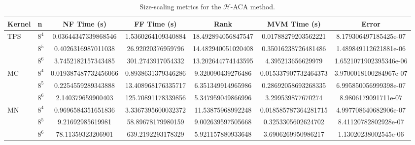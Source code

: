 \documentclass[final,3p,times]{elsarticle}
\newcommand{\mc}[1]{\mathcal{#1}}
\begin{document}
\begin{table}[!ht]
\centering
\scriptsize
\begin{tabular}{llSSSSS}
\hline
\textbf{Kernel} & \textbf{n} & \textbf{NF Time (s)} & \textbf{FF Time (s)} & \textbf{Rank} & \textbf{MVM Time (s)} & \textbf{Error} \\
\hline
        TPS & $8^4$ & 0.03644347339868546 & 1.5360264109340884 & 18.492894056847547 & 0.01788279203562221 & 8.179306497185425e-07 \\ 
         & $8^5$ & 0.4026316987011038 & 26.92020376959796 & 14.482940051020408 & 0.35016238726481486 & 1.489849112621881e-06 \\ 
         & $8^6$ & 3.7452182157343485 & 301.2743917054332 & 13.202644774143595 & 4.395213656629979 & 1.6521071902395346e-06 \\ \hline
        MC & $8^4$ & 0.019387487732456066 & 0.8938631379346286 & 9.320090439276486 & 0.015337907732464373 & 3.9700018100284967e-07 \\ 
         & $8^5$ & 0.2254559289343888 & 13.408968176335717 & 6.351349914965986 & 0.28692058693268335 & 6.995850056999398e-07 \\ 
         & $8^6$ & 2.140379659900403 & 125.70891178339856 & 5.347959049866996 & 3.299539877670274 & 8.9806179091711e-07 \\ \hline
        MN & $8^4$ & 0.9696584351651836 & 3.3367395600032372 & 11.53875968992248 & 0.018585787364281715 & 4.997708640682906e-07 \\ 
         & $8^5$ & 9.21692985619981 & 58.89678179980159 & 9.002639597505668 & 0.3253305602624702 & 8.41120782802928e-07 \\ 
         & $8^6$ & 78.11359323206901 & 639.2192293178329 & 5.921157880933648 & 3.6906269950986217 & 1.13020238002545e-06 \\ \hline
\end{tabular}%
\caption{Size-scaling metrics for the $\mc{H}$-ACA method.}
\label{tab:metrics_h-aca}
\end{table}
\end{document}

